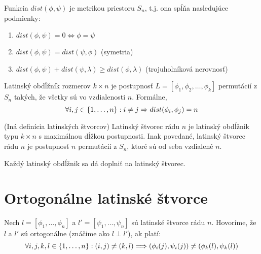 \begin{theorem}
    Funkcia $dist(\phi, \psi)$ je metrikou priestoru $S_n$, t.j. ona spĺňa nasledujúce podmienky:
    \begin{enumerate}
        \item $dist(\phi, \psi) = 0 \Leftrightarrow \phi = \psi$
        \item $dist(\phi, \psi) = dist(\psi, \phi)$ (symetria)
        \item $dist(\phi, \psi) + dist(\psi, \lambda) \geq dist(\phi, \lambda)$ (trojuholníková nerovnosť)  
    \end{enumerate}
\end{theorem}

\begin{definition}
Latinský obdĺžník rozmerov $k \times n$ je postupnosť $L = [\phi_1, \phi_2, \ldots, \phi_k]$ permutácií z $S_n$ takých,
že všetky sú vo vzdialenosti $n$. Formálne, 
$$\forall i, j \in \left\{1, \ldots, n\right\}: i \neq j \Rightarrow dist(\phi_i, \phi_j) = n$$
\end{definition}

\begin{definition}{(Iná definícia latinských štvorcov)}
Latinský štvorec rádu $n$ je latinský obdĺžnik typu $k \times n$ s maximálnou dĺžkou postupnosti. Inak povedané,
latinský štvorec rádu $n$ je postupnosť $n$ permutácií z $S_n$, ktoré sú od seba vzdialené $n$.
\end{definition}

\begin{theorem}
    Každý latinský obdĺžnik sa dá doplniť na latinský štvorec.
\end{theorem}

\section{Ortogonálne latinské štvorce}

\begin{definition}
Nech $l = [\phi_1, \ldots, \phi_n]$ a $l' = [\psi_1, \ldots, \psi_n]$ sú latinské štvorce rádu $n$. Hovoríme, že
$l$ a $l'$ sú ortogonálne (znáčime ako $l \perp l'$), ak platí: 
$$\forall i,j,k,l \in \left\{1, \ldots, n\right\}: (i, j) \neq (k, l) \Longrightarrow (\phi_i(j), \psi_i(j)) \neq  (\phi_k(l), \psi_k(l))$$

\end{definition}


